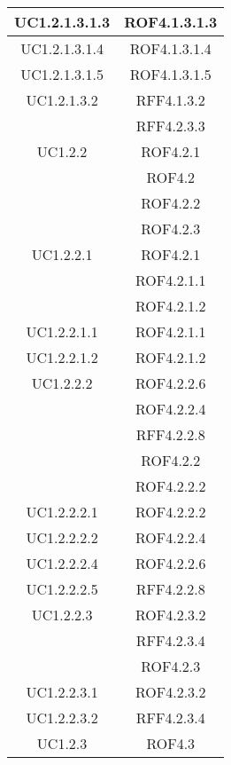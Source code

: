 \begin{longtable}{|c|c|}
\midrule
UC1.2.1.3.1.3
& ROF4.1.3.1.3\\

\midrule
UC1.2.1.3.1.4
& ROF4.1.3.1.4\\

\midrule
UC1.2.1.3.1.5
& ROF4.1.3.1.5\\

\midrule
UC1.2.1.3.2
& RFF4.1.3.2\\
& RFF4.2.3.3\\

\midrule
UC1.2.2
& ROF4.2.1\\
& ROF4.2\\
& ROF4.2.2\\
& ROF4.2.3\\

\midrule
UC1.2.2.1
& ROF4.2.1\\
& ROF4.2.1.1\\
& ROF4.2.1.2\\

\midrule
UC1.2.2.1.1
& ROF4.2.1.1\\

\midrule
UC1.2.2.1.2
& ROF4.2.1.2\\

\midrule
UC1.2.2.2
& ROF4.2.2.6\\
& ROF4.2.2.4\\
& RFF4.2.2.8\\
& ROF4.2.2\\
& ROF4.2.2.2\\

\midrule
UC1.2.2.2.1
& ROF4.2.2.2\\

\midrule
UC1.2.2.2.2
& ROF4.2.2.4\\

\midrule
UC1.2.2.2.4
& ROF4.2.2.6\\

\midrule
UC1.2.2.2.5
& RFF4.2.2.8\\

\midrule
UC1.2.2.3
& ROF4.2.3.2\\
& RFF4.2.3.4\\
& ROF4.2.3\\

\midrule
UC1.2.2.3.1
& ROF4.2.3.2\\

\midrule
UC1.2.2.3.2
& RFF4.2.3.4\\

\midrule
UC1.2.3
& ROF4.3\\


\end{longtable}
